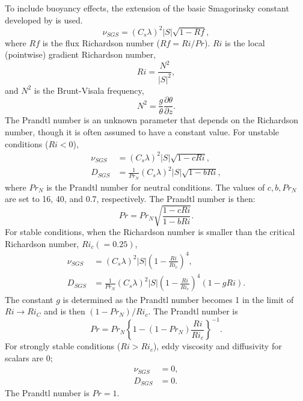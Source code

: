 To include buoyancy effects, the extension of the basic Smagorinsky constant developed by \citet{Brown_etal_1994}
is used.
\begin{equation}
  \nu_{SGS} = (C_s\lambda)^2 |S| \sqrt{1-Rf},
\end{equation}
where $Rf$ is the flux Richardson number ($Rf = Ri/Pr$).
$Ri$ is the local (pointwise) gradient Richardson number,
\begin{equation}
  Ri = \frac{N^2}{|S|^2},
  \label{eq:Ri}
\end{equation}
and $N^2$ is the Brunt-Visala frequency,
\begin{equation}
  N^2 = \frac{g}{\theta}\frac{\partial\theta}{\partial z}.
  \label{eq:N^2}
\end{equation}
The Prandtl number is an unknown parameter that depends on the Richardson number,
though it is often assumed to have a constant value.
For  unstable conditions ($Ri < 0$),
\begin{align}
  \nu_{SGS} &= \left(C_s\lambda\right)^2 |S| \sqrt{1 - c Ri}, \label{eq:nu unstable} \\
  D_{SGS} &= \frac{1}{Pr_N} \left(C_s\lambda\right)^2 |S| \sqrt{1 - b Ri} \label{eq:nu^* unstable},
\end{align}
where $Pr_N$ is the Prandtl number for neutral conditions.
The values of $c, b, Pr_N$ are set to 16, 40, and 0.7, respectively.
The Prandtl number is then:
\begin{equation}
  Pr = Pr_N \sqrt{\frac{1-c Ri}{1-b Ri}}.
\end{equation}
For stable conditions, when the Richardson number is smaller than the critical Richardson number, $Ri_c (=0.25)$,
\begin{align}
  \nu_{SGS} &= \left(C_s\lambda\right)^2 |S| \left(1-\frac{Ri}{Ri_c}\right)^4, \label{eq:nu stable} \\
  D_{SGS} &= \frac{1}{Pr_N}\left(C_s\lambda\right)^2 |S| \left(1-\frac{Ri}{Ri_c}\right)^4\left(1-g Ri\right). \label{eq:nu^* stable}
\end{align}
The constant $g$ is determined as the Prandtl number becomes 1
in the limit of $Ri \to Ri_C$ and is then $(1-Pr_N)/Ri_c$.
The Prandtl number is
\begin{equation}
  Pr = Pr_N \left\{1-(1-Pr_N)\frac{Ri}{Ri_c}\right\}^{-1}.
\end{equation}
For  strongly stable conditions ($Ri > Ri_c$), eddy viscosity and diffusivity for scalars are 0;
\begin{align}
  \nu_{SGS} &= 0, \label{eq:nu strong stable} \\
  D_{SGS} &= 0. \label{eq:nu^* strong stable}
\end{align}
The Prandtl number is $Pr = 1$.


